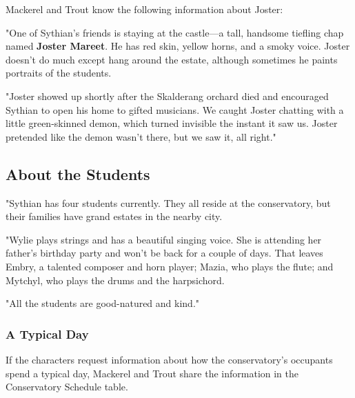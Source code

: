 \documentclass[10pt,a4paper,twoside,bg=print,twocolumn,openany,nodeprecatedcode]{dndbook}
\begin{document}
Mackerel and Trout know the following information about Joster:

\begin{DndReadAloud}{}
"One of Sythian's friends is staying at the castle—a tall, handsome tiefling chap named \textbf{Joster Mareet}. He has red skin, yellow horns, and a smoky voice. Joster doesn't do much except hang around the estate, although sometimes he paints portraits of the students.

"Joster showed up shortly after the Skalderang orchard died and encouraged Sythian to open his home to gifted musicians. We caught Joster chatting with a little green-skinned demon, which turned invisible the instant it saw us. Joster pretended like the demon wasn't there, but we saw it, all right."

\end{DndReadAloud}

\subsection{About the Students}
\begin{DndReadAloud}{}
"Sythian has four students currently. They all reside at the conservatory, but their families have grand estates in the nearby city.

"Wylie plays strings and has a beautiful singing voice. She is attending her father's birthday party and won't be back for a couple of days. That leaves Embry, a talented composer and horn player; Mazia, who plays the flute; and Mytchyl, who plays the drums and the harpsichord.

"All the students are good-natured and kind."

\end{DndReadAloud}

\subsubsection{A Typical Day}
If the characters request information about how the conservatory's occupants spend a typical day, Mackerel and Trout share the information in the Conservatory Schedule table.
\end{document}
